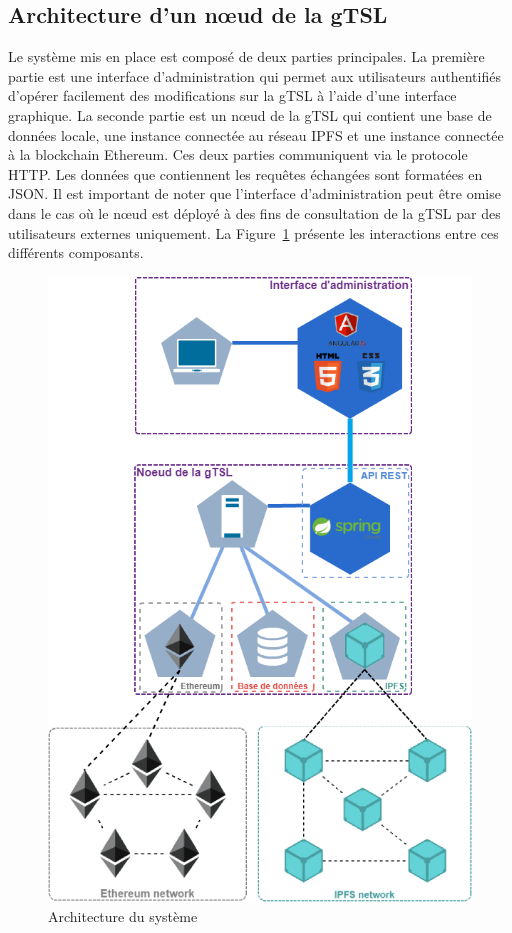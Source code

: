 \documentclass{tnreport}
\begin{document}
\subsection{Architecture d'un nœud de la gTSL}

Le système mis en place est composé de deux parties principales. La première partie est une interface d'administration qui permet aux utilisateurs authentifiés d'opérer facilement des modifications sur la gTSL à l'aide d'une interface graphique. La seconde partie est un nœud de la gTSL qui contient une base de données locale, une instance connectée au réseau IPFS et une instance connectée à la blockchain Ethereum. Ces deux parties communiquent via le protocole HTTP. Les données que contiennent les requêtes échangées sont formatées en JSON. Il est important de noter que l'interface d'administration peut être omise dans le cas où le nœud est déployé à des fins de consultation de la gTSL par des utilisateurs externes uniquement. La Figure~\ref{fig:architecture-node} présente les interactions entre ces différents composants.
\clearpage

\begin{figure}[h]
	\centering
	\includegraphics[scale=0.42]{figures/architecture}
	\caption{Architecture du système}
	\label{fig:architecture-node}
\end{figure}
\end{document}
